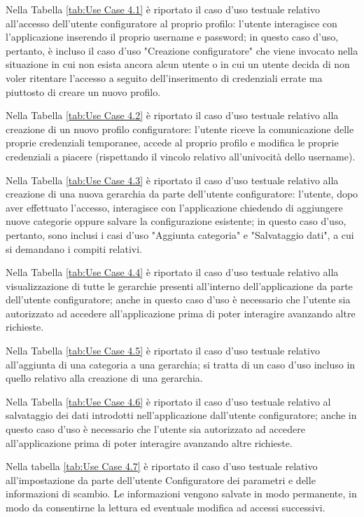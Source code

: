 Nella Tabella \ref{tab:Use Case 4.1} è riportato il caso d'uso testuale relativo all'accesso dell'utente configuratore al proprio profilo: l'utente interagisce con l'applicazione inserendo il proprio username e password; in questo caso d'uso, pertanto, è incluso il caso d'uso "Creazione configuratore" che viene invocato nella situazione in cui non esista ancora alcun utente o in cui un utente decida di non voler ritentare l'accesso a seguito dell'inserimento di credenziali errate ma piuttosto di creare un nuovo profilo.\bigskip

Nella Tabella \ref{tab:Use Case 4.2} è riportato il caso d'uso testuale relativo alla creazione di un nuovo profilo configuratore: l'utente riceve la comunicazione delle proprie credenziali temporanee, accede al proprio profilo e modifica le proprie credenziali a piacere (rispettando il vincolo relativo all'univocità dello username).\bigskip

Nella Tabella \ref{tab:Use Case 4.3} è riportato il caso d'uso testuale relativo alla creazione di una nuova gerarchia da parte dell'utente configuratore: l'utente, dopo aver effettuato l'accesso, interagisce con l'applicazione chiedendo di aggiungere nuove categorie oppure salvare la configurazione esistente; in questo caso d'uso, pertanto, sono inclusi i casi d'uso "Aggiunta categoria" e "Salvataggio dati", a cui si demandano i compiti relativi.\bigskip

Nella Tabella \ref{tab:Use Case 4.4} è riportato il caso d'uso testuale relativo alla visualizzazione di tutte le gerarchie presenti all'interno dell'applicazione da parte dell'utente configuratore; anche in questo caso d'uso è necessario che l'utente sia autorizzato ad accedere all'applicazione prima di poter interagire avanzando altre richieste.\bigskip

Nella Tabella \ref{tab:Use Case 4.5} è riportato il caso d'uso testuale relativo all'aggiunta di una categoria a una gerarchia; si tratta di un caso d'uso incluso in quello relativo alla creazione di una gerarchia.\bigskip

Nella Tabella \ref{tab:Use Case 4.6} è riportato il caso d'uso testuale relativo al salvataggio dei dati introdotti nell'applicazione dall'utente configuratore; anche in questo caso d'uso è necessario che l'utente sia autorizzato ad accedere all'applicazione prima di poter interagire avanzando altre richieste.\bigskip

Nella tabella \ref{tab:Use Case 4.7} è riportato il caso d'uso testuale relativo all'impostazione da parte dell'utente Configuratore dei parametri e delle informazioni di scambio. Le informazioni vengono salvate in modo permanente, in modo da consentirne la lettura ed eventuale modifica ad accessi successivi.\bigskip

